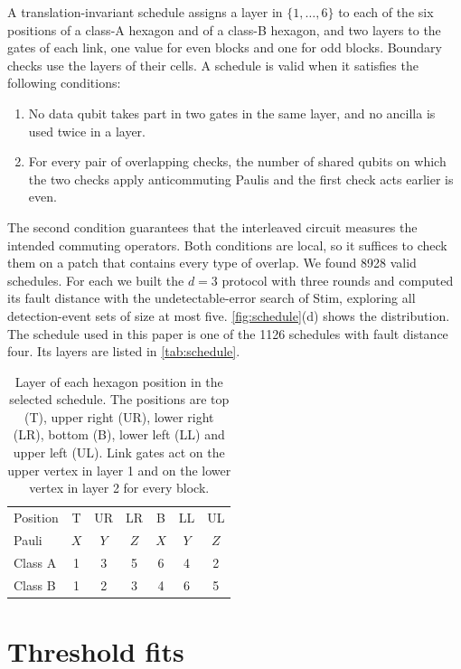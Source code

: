 A translation-invariant schedule assigns a layer in $\{1,\dots,6\}$ to each of the six positions of a class-A hexagon and of a class-B hexagon, and two layers to the gates of each link, one value for even blocks and one for odd blocks. Boundary checks use the layers of their cells. A schedule is valid when it satisfies the following conditions:
\begin{enumerate}
  \item No data qubit takes part in two gates in the same layer, and no ancilla is used twice in a layer.
  \item For every pair of overlapping checks, the number of shared qubits on which the two checks apply anticommuting Paulis and the first check acts earlier is even.
\end{enumerate}
The second condition guarantees that the interleaved circuit measures the intended commuting operators. Both conditions are local, so it suffices to check them on a patch that contains every type of overlap. We found 8928 valid schedules. For each we built the $d=3$ protocol with three rounds and computed its fault distance with the undetectable-error search of Stim, exploring all detection-event sets of size at most five. \autoref{fig:schedule}(d) shows the distribution. The schedule used in this paper is one of the 1126 schedules with fault distance four. Its layers are listed in \autoref{tab:schedule}.

\begin{table}[t]
  \caption{Layer of each hexagon position in the selected schedule. The positions are top (T), upper right (UR), lower right (LR), bottom (B), lower left (LL) and upper left (UL). Link gates act on the upper vertex in layer 1 and on the lower vertex in layer 2 for every block.}
  \label{tab:schedule}
  \begin{ruledtabular}
  \begin{tabular}{lcccccc}
    Position & T & UR & LR & B & LL & UL \\
    Pauli & $X$ & $Y$ & $Z$ & $X$ & $Y$ & $Z$ \\
    \hline
    Class A & 1 & 3 & 5 & 6 & 4 & 2 \\
    Class B & 1 & 2 & 3 & 4 & 6 & 5 \\
  \end{tabular}
  \end{ruledtabular}
\end{table}

\section{Threshold fits}
\label{app:fits}

